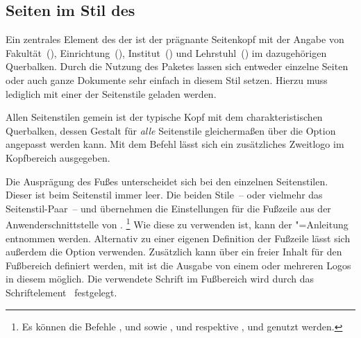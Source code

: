 \subsection{Seiten im Stil des \CDs}
\begin{Declaration}[v2.02]{}
\begin{Declaration}[v2.02]{}
\begin{Declaration}[v2.02]{}
\printdeclarationlist%
\label{sec:tudheadings}
%
%
Ein zentrales Element des \CDs der \TnUD ist der prägnante Seitenkopf mit der 
Angabe von Fakultät~(), Einrichtung~(), 
Institut~() und Lehrstuhl~() im dazugehörigen 
Querbalken. Durch die Nutzung des Paketes  lassen 
sich entweder einzelne Seiten oder auch ganze Dokumente sehr einfach in diesem 
Stil setzen. Hierzu muss lediglich mit  
einer der Seitenstile geladen werden. 

Allen Seitenstilen gemein ist der typische Kopf mit dem charakteristischen 
Querbalken, dessen Gestalt für \emph{alle} Seitenstile gleichermaßen über die 
Option  angepasst werden kann. Mit dem Befehl  
lässt sich ein zusätzliches Zweitlogo im Kopfbereich ausgegeben.

Die Ausprägung des Fußes unterscheidet sich bei den einzelnen Seitenstilen. 
Dieser ist beim Seitenstil  immer leer. Die beiden 
Stile~-- oder vielmehr das Seitenstil-Paar~--  und 
 übernehmen die Einstellungen für die Fußzeile aus 
der Anwenderschnittstelle von .%
\footnote{%
  Es können die Befehle ,  und  sowie 
  ,  und  respektive , 
   und  genutzt werden.
}
Wie diese zu verwenden ist, kann der \KOMAScript"=Anleitung entnommen werden. 
Alternativ zu einer eigenen Definition der Fußzeile lässt sich außerdem die 
Option  verwenden. Zusätzlich kann über  ein 
freier Inhalt für den Fußbereich definiert werden, mit  ist die 
Ausgabe von einem oder mehreren Logos in diesem möglich. Die verwendete Schrift 
im Fußbereich wird durch das Schriftelement~ festgelegt.


\end{Declaration}
\end{Declaration}
\end{Declaration}

